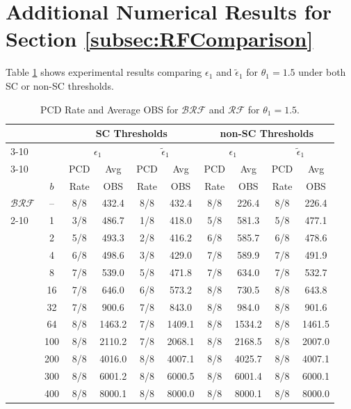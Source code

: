 \documentclass[11pt]{article}
\begin{document}
\section{Additional Numerical Results for Section \ref{subsec:RFComparison}}
\label{sec:RFComparison_Additional}

Table \ref{tab:brf_rf_sc_nonsc_additional} shows experimental results comparing $\epsilon_1$ and $\tilde{\epsilon}_1$ for $\theta_1=1.5$ under both SC or non-SC thresholds. 

\begin{table}[h!]
\centering
\scriptsize
{\normalsize
\caption{PCD Rate and Average OBS for $\mathcal{BRF}$ and $\mathcal{RF}$ for $\theta_1=1.5$.}
\label{tab:brf_rf_sc_nonsc_additional}
\renewcommand{\arraystretch}{0.8}
\begin{tabular}{lc||cc|cc|cc|cc}
\toprule
& &
\multicolumn{4}{c|}{SC Thresholds} &
\multicolumn{4}{c}{non-SC Thresholds} \\ \cline{3-10}
& & 
\multicolumn{2}{c}{$\epsilon_1$} &
\multicolumn{2}{c|}{$\tilde{\epsilon}_1$} & \multicolumn{2}{c}{$\epsilon_1$} &
\multicolumn{2}{c}{$\tilde{\epsilon}_1$} \\ \cline{3-10}
& & PCD & Avg & PCD & Avg & PCD & Avg & PCD & Avg \\
& $b$ & Rate & OBS & Rate & OBS & Rate & OBS & Rate & OBS \\\midrule

$\mathcal{BRF}$ & --  & 8/8 & 432.4 & 8/8 & 432.4 & 8/8 & 226.4 & 8/8 & 226.4 \\ \cline{2-10}

\multirow{11}{*}{$\mathcal{RF}$}
& 1 & 3/8 & 486.7 & 1/8 & 418.0 & 5/8 & 581.3 & 5/8 & 477.1 \\
& 2 & 5/8 & 493.3 & 2/8 & 416.2 & 6/8 & 585.7 & 6/8 & 478.6 \\
& 4 & 6/8 & 498.6 & 3/8 & 429.0 & 7/8 & 589.9 & 7/8 & 491.9 \\
& 8 & 7/8 & 539.0 & 5/8 & 471.8 & 7/8 & 634.0 & 7/8 & 532.7 \\
& 16 & 7/8 & 646.0 & 6/8 & 573.2 & 8/8 & 730.5 & 8/8 & 643.8 \\
& 32 & 7/8 & 900.6 & 7/8 & 843.0 & 8/8 & 984.0 & 8/8 & 901.6 \\
& 64 & 8/8 & 1463.2 & 7/8 & 1409.1 & 8/8 & 1534.2 & 8/8 & 1461.5 \\
& 100 & 8/8 & 2110.2 & 7/8 & 2068.1 & 8/8 & 2168.5 & 8/8 & 2007.0 \\
& 200 & 8/8 & 4016.0 & 8/8 & 4007.1 & 8/8 & 4025.7 & 8/8 & 4007.1 \\
& 300 & 8/8 & 6001.2 & 8/8 & 6000.5 & 8/8 & 6001.4 & 8/8 & 6000.1 \\
& 400 & 8/8 & 8000.1 & 8/8 & 8000.0 & 8/8 & 8000.1 & 8/8 & 8000.0 \\ 
\bottomrule
\end{tabular}}
\end{table}
\end{document}
